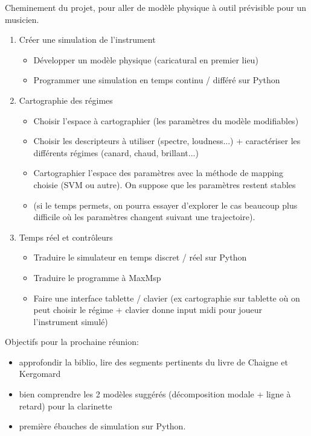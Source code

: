 \documentclass[a4paper, 11pt]{article}
\begin{document}
Cheminement du projet, pour aller de modèle physique à outil prévisible pour un musicien.
\begin{enumerate}
\item Créer une simulation de l'instrument
	\begin{itemize}
	\item Développer un modèle physique (caricatural en premier lieu)
	\item Programmer une simulation en temps continu / différé sur Python
	\end{itemize}
\item Cartographie des régimes
	\begin{itemize}
	\item Choisir l'espace à cartographier (les paramètres du modèle modifiables)
	\item Choisir les descripteurs à utiliser (spectre, loudness...) + caractériser les différents régimes (canard, chaud, brillant...)
	\item Cartographier l'espace des paramètres avec la méthode de mapping choisie (SVM ou autre). On suppose que les paramètres restent stables
	\item (si le temps permets, on pourra essayer d'explorer le cas beaucoup plus difficile où les paramètres changent suivant une trajectoire).
	\end{itemize}
\item Temps réel et contrôleurs
	\begin{itemize}
	\item Traduire le simulateur en temps discret / réel sur Python
	\item Traduire le programme à MaxMsp
	\item Faire une interface tablette / clavier (ex cartographie sur tablette où on peut choisir le régime + clavier donne input midi pour joueur l'instrument simulé)
	\end{itemize}
\end{enumerate}

\bigskip

Objectifs pour la prochaine réunion:
\begin{itemize}
\item approfondir la biblio, lire des segments pertinents du livre de Chaigne et Kergomard
\item bien comprendre les 2 modèles suggérés (décomposition modale + ligne à retard) pour la clarinette
\item première ébauches de simulation sur Python.
\end{itemize}
\end{document}
